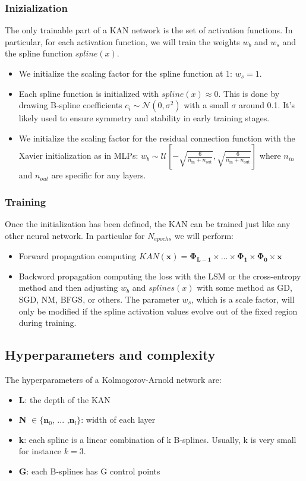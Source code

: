 \documentclass[12pt,a4paper]{article}
\begin{document}
\subsubsection{Inizialization}
The only trainable part of a KAN network is the set of activation functions. In particular, for each activation function, we will train the weights $w_b$ and $w_s$ and the spline function $spline(x)$. 
\begin{itemize}
    \item We initialize the scaling factor for the spline function at 1: $w_s=1$. 
    \item Each spline function is initialized with $spline(x) \approx 0$.  This is done by drawing B-spline coefficients $c_i \sim \mathcal{N}(0, \sigma^2)$ with a small $\sigma$ around 0.1. It's likely used to ensure symmetry and stability in early training stages.
    \item We initialize the scaling factor for the residual connection function with the Xavier initialization as in MLPs: $w_b \sim \mathcal{U}\left[-\sqrt{\frac{6}{n_{\text{in}} + n_{\text{out}}}}, \sqrt{\frac{6}{n_{\text{in}} + n_{\text{out}}}}\right]$ where $n_{in}$ and $n_{out}$ are specific for any layers.
\end{itemize}

\subsubsection{Training}
Once the initialization has been defined, the KAN can be trained just like any other neural network. In particular for $N_{epochs}$ we will perform:
\begin{itemize}
    \item Forward propagation computing $KAN(\textbf{x}) = \boldsymbol{\Phi_{L-1}} \times \dots \times \boldsymbol{\Phi_{1}} \times \boldsymbol{\Phi_{0}} \times \textbf{x}$
    \item Backword propagation computing the loss with the LSM or the cross-entropy method and then adjusting $w_b$ and $ splines(x)$ with some method as GD, SGD, NM, BFGS, or others. The parameter $w_s$, which is a scale factor, will only be modified if the spline activation values evolve out of the fixed region during training.
\end{itemize}

\subsection{Hyperparameters and complexity}
The hyperparameters of a Kolmogorov-Arnold network are:
\begin{itemize}
    \item \textbf{L}: the depth of the KAN
    \item \textbf{N} $ \in \{\textbf{n}_0$, ... ,$\textbf{n}_l\}$: width of each layer
    \item \textbf{k}: each spline is a linear combination of k B-splines. Usually, k is very small for instance $k=3$.
    \item \textbf{G}: each B-splines has G control points
\end{itemize}
\end{document}
